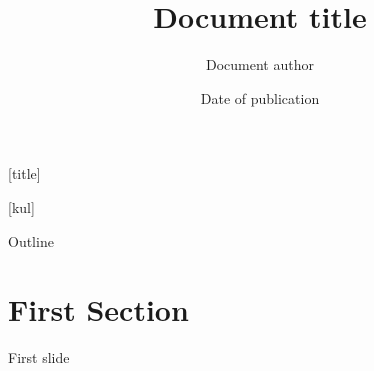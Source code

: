 \documentclass[t,12pt,english
\ifx\beamermode\undefined\else,\beamermode\fi
]{beamer}
\title{Document title}
\author{Document author}
\date{Date of publication}
\institute{ExpORL, Dept. Neurosciences, University of Leuven, Belgium}
\begin{document}
[title]

\begin{frame}[plain]
    \titlepage
\end{frame}
\note{}

[kul]


\begin{frame}{Outline}
\tableofcontents
\end{frame}

\section{First Section}\label{first-section}

\begin{frame}{First slide}

\end{frame}
\end{document}
